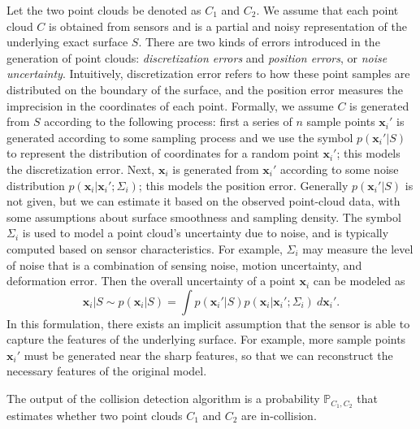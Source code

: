 Let the two point clouds be denoted as $C_1$ and $C_2$.
We assume that each point cloud $C$ is obtained from sensors and is a partial
and noisy representation of the underlying exact surface $S$. There are two kinds of errors introduced in the generation of point clouds: \emph{discretization errors}
and \emph{position errors}, or \emph{noise uncertainty}. Intuitively, discretization error refers to how these point samples are distributed on the boundary of the surface, and the position error measures the imprecision in the coordinates of each point. Formally, we assume $C$ is generated from $S$ according to the following process: first a series of $n$ sample
points $\mathbf x_i'$ is generated according to some sampling process and we use the symbol $p(\mathbf x_i'|S)$ to represent the distribution of coordinates for a random point $\mathbf x_i'$; this models the discretization error. Next, $\mathbf x_i$ is generated from $\mathbf x_i'$
according to some noise distribution $p(\mathbf x_i|\mathbf x_i'; \Sigma_i)$; this models the position error. Generally $p(\mathbf x_i' |S)$ is not given, but we can estimate it based on the observed point-cloud data, with some assumptions about surface smoothness and sampling density. The symbol $\Sigma_i$ is used to model a point cloud's uncertainty due to noise, and is typically computed based on sensor characteristics. For example, $\Sigma_i$ may measure the level of noise that is a combination of sensing noise, motion uncertainty, and deformation error. Then the overall uncertainty of a point $\mathbf x_i$ can be modeled as
\begin{equation}
\label{eq:7:point-model}
\mathbf x_i|S \sim p(\mathbf x_i|S) = \int p(\mathbf x_i'|S)p(\mathbf x_i|\mathbf x_i'; \Sigma_i) \ d\mathbf x_i'.
\end{equation}
In this formulation, there exists an implicit assumption that the sensor is able to capture the features of the underlying surface. For example, more sample points $\mathbf x_i'$ must be generated near the sharp features, so that we can reconstruct the necessary features of the original model.

The output of the collision detection algorithm is a probability $\mathbb{P}_{C_1, C_2}$ that estimates whether two point clouds $C_1$ and $C_2$ are in-collision.


